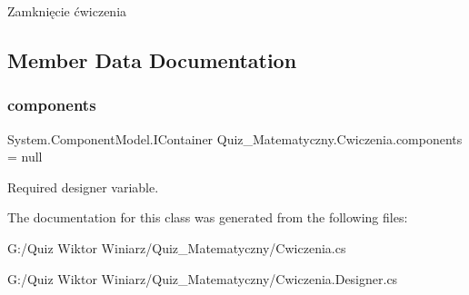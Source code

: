 Zamknięcie ćwiczenia 

\subsection{Member Data Documentation}
\mbox{\label{class_quiz___matematyczny_1_1_cwiczenia_aaa628a9f3b4019b398ea588f67ecbc5b}} 
\subsubsection{\texorpdfstring{components}{components}}
{\footnotesize\ttfamily System.\+Component\+Model.\+I\+Container Quiz\+\_\+\+Matematyczny.\+Cwiczenia.\+components = null\hspace{0.3cm}{\ttfamily [private]}}



Required designer variable. 



The documentation for this class was generated from the following files\+:\begin{DoxyCompactItemize}
\item 
G\+:/\+Quiz Wiktor Winiarz/\+Quiz\+\_\+\+Matematyczny/Cwiczenia.\+cs\item 
G\+:/\+Quiz Wiktor Winiarz/\+Quiz\+\_\+\+Matematyczny/Cwiczenia.\+Designer.\+cs\end{DoxyCompactItemize}
